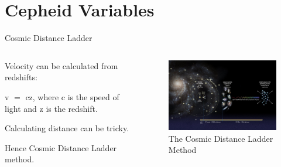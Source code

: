 \documentclass[aspectratio=169]{beamer}                    %
\begin{document}
\section{Cepheid Variables}
\begin{frame}{Cosmic Distance Ladder}
\graphicspath{ {./Images/} }
    \begin{columns}

    \begin{vfilleditems}
      \item Velocity can be calculated from redshifts: \par v $=$ cz, where c is the speed of light and z is the redshift.
      \item Calculating distance can be tricky.
      \item Hence Cosmic Distance Ladder method.
    \end{vfilleditems}
    
    \begin{figure}
        \centering
        \includegraphics[width=8cm]{CDL1.jpg}
        \caption{The Cosmic Distance Ladder Method}
        \label{fig:CDL}
    \end{figure}
    \end{columns}
\end{frame}
\end{document}

